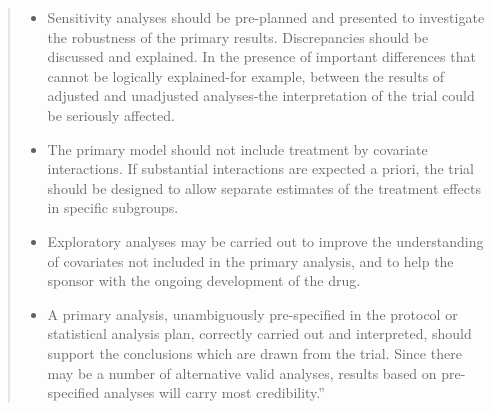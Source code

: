\begin{quote}
\begin{itemize}
\item Sensitivity analyses should be pre-planned and presented to investigate the robustness of the primary results.  Discrepancies should be discussed and explained.  In the presence of important differences that cannot be logically explained-for example, between the results of adjusted and unadjusted analyses-the interpretation of the trial could be seriously affected.
\item The primary model should not include treatment by covariate interactions.  If substantial interactions are expected a priori, the trial should be designed to allow separate estimates of the treatment effects in specific subgroups.
\item Exploratory analyses may be carried out to improve the understanding of covariates not included in the primary analysis, and to help the sponsor with the ongoing development of the drug.
\item A primary analysis, unambiguously pre-specified in the protocol or statistical analysis plan, correctly carried out and interpreted, should support the conclusions which are drawn from the trial.  Since there may be a number of alternative valid analyses, results based on pre-specified analyses will carry most credibility.''
\end{itemize}
  \end{quote}

